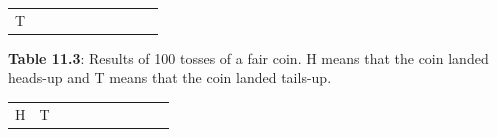 {{\begin{center}
\begin{tabular}[t]{|l|l|l|l|l|l|l|l|l|l|}
        T%
     \tabularnewline\cline{1-1}\cline{2-2}\cline{3-3}\cline{4-4}\cline{5-5}\cline{6-6}\cline{7-7}\cline{8-8}\cline{9-9}\cline{10-10}
    \end{tabular}
      \end{center}
    \begin{center}{\small\bfseries Table 11.3}: Results of 100 tosses of a fair coin. H means that the coin
landed heads-up and T means that the coin landed tails-up.\end{center}
    
    \addtocounter{footnote}{-0}
    
          }{ %
        
    
        \begin{center}
      
      \label{m39373*uid56}
      
    \noindent
      \tablelasttail{}
      \begin{xtabular}[t]{|l|l|l|l|l|l|l|l|l|l|}\hline
    
    
        H &
    
    
        T &
    
    

\end{xtabular}
\end{center}}}
